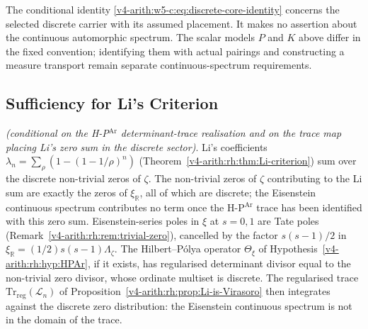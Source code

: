 \begin{remark}
\label{v4-arith:w5-c:rem:eisenstein-placement}
The conditional identity
\eqref{v4-arith:w5-c:eq:discrete-core-identity} concerns the selected
discrete carrier with its assumed placement. It makes no assertion
about the continuous automorphic spectrum. The scalar models
\(P\) and \(K\) above differ in the fixed convention; identifying
them with actual pairings and constructing a measure transport
remain separate continuous-spectrum requirements.
\end{remark}

\subsection{Sufficiency for Li's Criterion}
\label{v4-arith:w5-c:eisenstein:Li}

\begin{proposition}
\label{v4-arith:w5-c:prop:domain-suffices-for-Li}
\emph{(conditional on the
H-P\(^{\mathrm{Ar}}\) determinant-trace realisation and on the trace map placing
Li's zero sum in the discrete sector)}. Li's coefficients
\(\lambda_{n}=\sum_{\rho}(1-(1-1/\rho)^{n})\)
(Theorem~\ref{v4-arith:rh:thm:Li-criterion}) sum over the discrete
non-trivial zeros of \(\zeta\). The non-trivial zeros of \(\zeta\) contributing to the Li sum are
exactly the zeros of \(\xi_{\mathbb{R}}\), all of which are discrete;
the Eisenstein continuous spectrum contributes no term once the
H-P\(^{\mathrm{Ar}}\) trace has been identified with this zero sum.
Eisenstein-series poles in \(\xi\) at \(s=0,1\) are Tate poles
(Remark~\ref{v4-arith:rh:rem:trivial-zero}), cancelled by the factor
\(s(s-1)/2\) in
\(\xi_{\mathbb R}=(1/2)s(s-1)\Lambda_{\zeta}\). The Hilbert--P\'olya
operator \(\Theta_{\xi}\) of Hypothesis~\ref{v4-arith:rh:hyp:HPAr}, if it exists,
has regularised determinant divisor equal to the non-trivial zero
divisor, whose ordinate multiset is discrete.
The regularised trace
\(\mathrm{Tr}_{\mathrm{reg}}(\mathcal L_{n})\) of
Proposition~\ref{v4-arith:rh:prop:Li-is-Virasoro} then integrates against
the discrete zero distribution: the Eisenstein continuous spectrum is
not in the domain of the trace.
\end{proposition}

